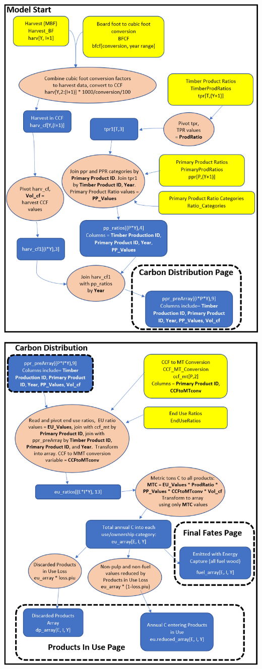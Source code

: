 \documentclass[
  openany]{book}
\begin{document}
\includegraphics[width=1\linewidth]{images/schematic-1}

\newpage

\includegraphics[width=1\linewidth]{images/schematic-2}
\end{document}
